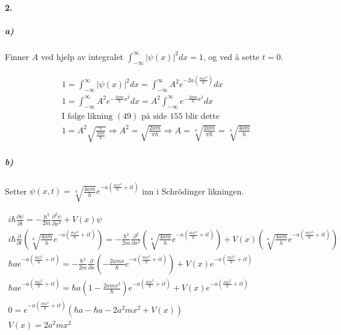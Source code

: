 \documentclass[11pt, A4paper,norsk]{article}
\begin{document}
		\paragraph{2.}
			\subparagraph{a)}
				\begin{flushleft}
Finner $A$ ved hjelp av integralet $\int_{- \infty}^{\infty} |\psi(x)|^2 dx = 1$, og ved å sette $t = 0$.
				\end{flushleft}
				\begin{gather*}
1 = \int_{- \infty}^{\infty} |\psi(x)|^2 dx = \int_{- \infty}^{\infty} A^2 e^{- 2 a \left( \frac{mx^2}{\hbar} \right)} dx \\
1 = \int_{- \infty}^{\infty} A^2 e^{- \frac{2 a m}{\hbar} x^2} dx = A^2 \int_{- \infty}^{\infty} e^{- \frac{2 a m}{\hbar} x^2} dx \\
\text{I følge likning $(49)$ på side $155$ blir dette} \\
1 = A^2 \sqrt{\frac{\pi}{\frac{2 a m}{\hbar}}} \Rightarrow A^2 = \sqrt{\frac{2 a m}{\pi \hbar}} \Rightarrow A = \sqrt[4]{\frac{2 a m}{\pi \hbar}} = \sqrt[4]{\frac{4 a m}{h}}
				\end{gather*}










			\subparagraph{b)}
				\begin{flushleft}
Setter $\psi(x, t) = \sqrt[4]{\frac{4 a m}{h}}e^{-a \left(\frac{mx^2}{\hbar} + it\right)}$ inn i Schrödinger likningen.
				\end{flushleft}
				\begin{gather*}
i \hbar \frac{\partial \psi}{\partial t} = - \frac{\hbar^2}{2m} \frac{\partial^2 \psi}{\partial x^2} + V(x) \psi \\
i \hbar \frac{\partial}{\partial t} \left( \sqrt[4]{\frac{4 a m}{h}}e^{-a \left(\frac{mx^2}{\hbar} + it\right)} \right) = - \frac{\hbar^2}{2m} \frac{\partial^2}{\partial x^2} \left( \sqrt[4]{\frac{4 a m}{h}}e^{-a \left(\frac{mx^2}{\hbar} + it\right)} \right) + V(x) \left( \sqrt[4]{\frac{4 a m}{h}}e^{-a \left(\frac{mx^2}{\hbar} + it\right)} \right) \\
\hbar a e^{- a \left( \frac{m x^2}{\hbar} + it \right)} = - \frac{\hbar^2}{2 m} \frac{\partial}{\partial x} \left(- \frac{2 a m x}{\hbar} e^{-a \left( \frac{m x^2}{\hbar} + it \right)} \right) + V(x) e^{-a \left(\frac{mx^2}{\hbar} + it\right)} \\
\hbar a e^{- a \left( \frac{m x^2}{\hbar} + it \right)} = \hbar a \left(1 - \frac{2a mx^2}{\hbar} \right) e^{- a \left( \frac{m x^2}{\hbar} + it \right)} + V(x)e^{- a \left( \frac{m x^2}{\hbar} + it \right)} \\
0 = e^{- a \left( \frac{m x^2}{\hbar} + it \right)} \left( \hbar a - \hbar a - 2 a^2 m x^2 + V(x) \right) \\
V(x) = 2a^2 m x^2
				\end{gather*}
\end{document}
